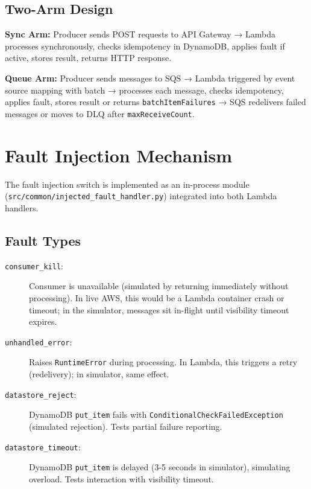 \subsection{Two-Arm Design}

\textbf{Sync Arm:} Producer sends POST requests to API Gateway → Lambda processes synchronously, checks idempotency in DynamoDB, applies fault if active, stores result, returns HTTP response.

\textbf{Queue Arm:} Producer sends messages to SQS → Lambda triggered by event source mapping with batch → processes each message, checks idempotency, applies fault, stores result or returns \texttt{batchItemFailures} → SQS redelivers failed messages or moves to DLQ after \texttt{maxReceiveCount}.

\section{Fault Injection Mechanism}

The fault injection switch is implemented as an in-process module (\texttt{src/common/injected\_fault\_handler.py}) integrated into both Lambda handlers.

\subsection{Fault Types}

\begin{description}
    \item[\texttt{consumer\_kill}:] Consumer is unavailable (simulated by returning immediately without processing). In live AWS, this would be a Lambda container crash or timeout; in the simulator, messages sit in-flight until visibility timeout expires.
    
    \item[\texttt{unhandled\_error}:] Raises \texttt{RuntimeError} during processing. In Lambda, this triggers a retry (redelivery); in simulator, same effect.
    
    \item[\texttt{datastore\_reject}:] DynamoDB \texttt{put\_item} fails with \texttt{ConditionalCheckFailedException} (simulated rejection). Tests partial failure reporting.
    
    \item[\texttt{datastore\_timeout}:] DynamoDB \texttt{put\_item} is delayed (3-5 seconds in simulator), simulating overload. Tests interaction with visibility timeout.
\end{description}

